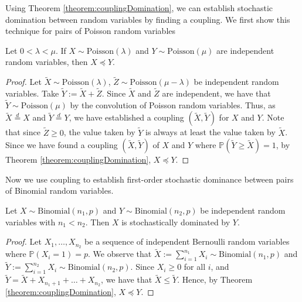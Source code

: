 Using Theorem \ref{theorem:couplingDomination}, we can establish stochastic domination between random variables by finding a coupling. We first show this technique	for pairs of Poisson random variables

\begin{theorem}\label{theorem:poissonDomination}
	Let $0 < \lambda < \mu$. If $X \sim \text{Poisson}(\lambda)$ and $Y \sim \text{Poisson}(\mu)$ are independent random variables, then $X \preceq Y$. 
\end{theorem}

\begin{proof}
	Let $\tilde{X} \sim \text{Poisson}(\lambda)$, $\tilde{Z} \sim \text{Poisson}(\mu - \lambda)$ be independent random variables. Take $\tilde{Y} := \tilde{X} + \tilde{Z}$. Since $\tilde{X}$ and $\tilde{Z}$ are independent, we have that $\tilde{Y} \sim \text{Poisson}(\mu)$ by the convolution of Poisson random variables. Thus, as $\tilde{X} \stackrel{d}{=} X$ and $\tilde{Y} \stackrel{d}{=} Y $, we have established a coupling $(\tilde{X}, \tilde{Y})$ for $X$ and $Y$. Note that since $\tilde{Z} \geq 0$, the value taken by $\tilde{Y}$ is always at least the value taken by $\tilde{X}$. Since we have found a coupling $(\tilde{X}, \tilde{Y})$ of $X$ and $Y$ where $\mathbb{P}(\tilde{Y} \geq \tilde{X}) = 1$, by Theorem \ref{theorem:couplingDomination}, $X \preceq Y$.
\end{proof}

Now we use coupling to establish first-order stochastic dominance between pairs of Binomial random variables.

\begin{theorem}\label{theorem:binomialDomination}
	Let $X \sim \text{Binomial}(n_1, p)$ and $Y \sim \text{Binomial}(n_2, p)$ be independent random variables with $n_1 < n_2$. Then $X$ is stochastically dominated by $Y$.
\end{theorem}

\begin{proof}
	Let $X_1, \dots, X_{n_2}$ be a sequence of independent Bernoulli random variables where $\mathbb{P}(X_i = 1) = p$. We observe that $\tilde{X} := \sum_{i=1}^{n_1} X_i \sim \text{Binomial}(n_1, p)$ and $\tilde{Y} := \sum_{i=1}^{n_2} X_i \sim \text{Binomial}(n_2, p)$. Since $X_i \geq 0$ for all $i$, and $\tilde{Y} = \tilde{X} + X_{n_1 + 1} + \dots + X_{n_2}$, we have that $\tilde{X} \leq \tilde{Y}$. Hence, by Theorem \ref{theorem:couplingDomination}, $X \preceq Y$.
\end{proof}
